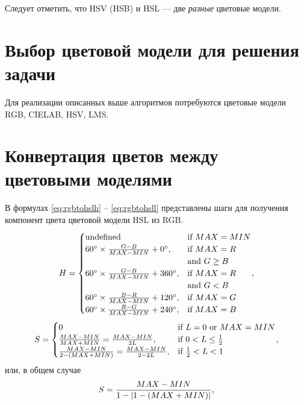 \documentclass[a4paper,14pt, unknownkeysallowed]{extreport}
\begin{document}
    Следует отметить, что HSV (HSB) и HSL — две \textit{разные} цветовые модели.

    \section{Выбор цветовой модели для решения задачи}

    Для реализации описанных выше алгоритмов потребуются цветовые модели RGB, CIELAB, HSV, LMS.

    \section{Конвертация цветов между цветовыми моделями}
    \label{sec:models_conerting}

    В формулах \ref{eq:rgbtohslh} -- \ref{eq:rgbtohsll} представлены шаги для получения компонент цвета цветовой модели HSL из RGB.
\begin{equation}
	{\label{eq:rgbtohslh}\displaystyle H={\begin{cases}{\mbox{undefined}}&{\mbox{if }}MAX=MIN\\60^{\circ }\times {\frac {G-B}{MAX-MIN}}+0^{\circ },&{\mbox{if }}MAX=R\\&{\mbox{and }}G\geq B\\60^{\circ }\times {\frac {G-B}{MAX-MIN}}+360^{\circ },&{\mbox{if }}MAX=R\\&{\mbox{and }}G<B\\60^{\circ }\times {\frac {B-R}{MAX-MIN}}+120^{\circ },&{\mbox{if }}MAX=G\\60^{\circ }\times {\frac {R-G}{MAX-MIN}}+240^{\circ },&{\mbox{if }}MAX=B\end{cases}},}
\end{equation}
\begin{equation}
	{\label{eq:rgbtohsls0}\displaystyle S={\begin{cases}0&{\mbox{if }}L=0{\mbox{ or }}MAX=MIN\\{\frac {MAX-MIN}{MAX+MIN}}={\frac {MAX-MIN}{2L}},&{\mbox{if }}0<L\leq {\frac {1}{2}}\\{\frac {MAX-MIN}{2-(MAX+MIN)}}={\frac {MAX-MIN}{2-2L}},&{\mbox{if }}{\frac {1}{2}}<L<1\\\end{cases}},}
\end{equation} или, в общем случае
\begin{equation}
	{\label{eq:rgbtohsls1}\displaystyle S={\frac {MAX-MIN}{1-|1-(MAX+MIN)|}},}
\end{equation}
\end{document}

